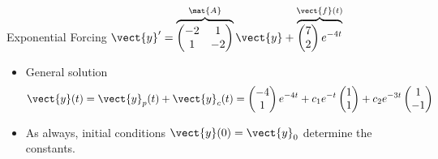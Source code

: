 \begin{frame}{Exponential Forcing \qquad $\vect{y}'=\overbrace{\begin{pmatrix}-2&1\\1&-2\end{pmatrix}}^{\mat{A}}\vect{y}+\overbrace{\begin{pmatrix}7\\2\end{pmatrix}e^{-4t}}^{\vect{f}(t)}$}
\begin{itemize}
  and $\vect{y}_p(t)=\begin{pmatrix}-4\\1\end{pmatrix}e^{-4t}$.
  \item General solution
  \[
    \vect{y}(t)=\vect{y}_p(t)+\vect{y}_c(t)
    =\begin{pmatrix}-4\\1\end{pmatrix}e^{-4t}
    +c_1e^{-t}\begin{pmatrix}1\\1\end{pmatrix}
    +c_2e^{-3t}\begin{pmatrix}1\\-1\end{pmatrix}
  \]
  \item As always, initial conditions $\vect{y}(0)=\vect{y}_0$ determine the constants.
\end{itemize}
\end{frame}
